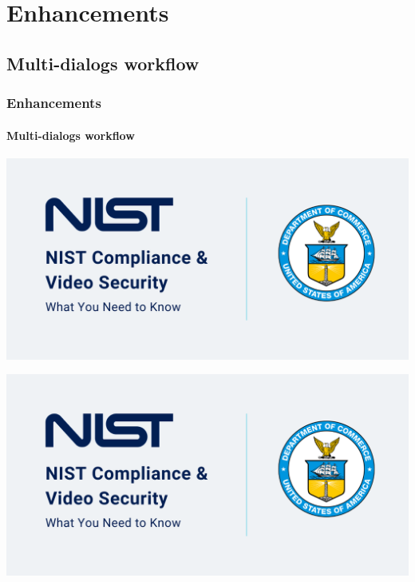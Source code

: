 \def\sectiontitle{Enhancements}

\section{\sectiontitle}

\def\slidetitle{Multi-dialogs workflow}

\subsection{\slidetitle}
\begin{frame}
  \frametitle{\sectiontitle}
  \framesubtitle{\slidetitle}

  \begin{minipage}[h!]{0.45\textwidth}
    \includegraphics[scale=0.2]{./img/example-image.png}
  \end{minipage}\hfill
  \begin{minipage}[h!]{0.45\textwidth}
    \includegraphics[scale=0.2]{./img/example-image.png}
  \end{minipage}
\end{frame}

\def\slidetitle{CSV viewer}


